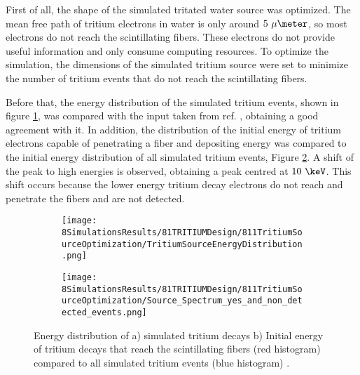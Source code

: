 First of all, the shape of the simulated tritated water source was optimized. The mean free path of tritium electrons in water is only around $5~\mu\meter$, so most electrons do not reach the scintillating fibers. These electrons do not provide useful information and only consume computing resources. To optimize the simulation, the dimensions of the simulated tritium source were set to minimize the number of tritium events that do not reach the scintillating fibers. 

Before that, the energy distribution of the simulated tritium events, shown in figure \ref{subfig:EnergyDistributionTritiumSource}, was compared with the input taken from ref. \cite{TritiumEmissionSpectrum}, obtaining a good agreement with it. In addition, the distribution of the initial energy of tritium electrons capable of penetrating a fiber and depositing energy was compared to the initial energy distribution of all simulated tritium events, Figure \ref{subfig:EnergySpectrumEventsDetectedandNonDetected}. A shift of the peak to high energies is observed, obtaining a peak centred at $10~\keV$. This shift occurs because the lower energy tritium decay electrons do not reach and penetrate the fibers and are not detected.

\begin{figure}
\centering
    \begin{subfigure}[b]{0.45\textwidth}
    \centering
    \texttt{[image: 8SimulationsResults/81TRITIUMDesign/811TritiumSourceOptimization/TritiumSourceEnergyDistribution.png]}  
    \caption{\label{subfig:EnergyDistributionTritiumSource}}
    \end{subfigure}
    \hfill
    \begin{subfigure}[b]{0.45\textwidth}
    \centering
    \texttt{[image: 8SimulationsResults/81TRITIUMDesign/811TritiumSourceOptimization/Source\_Spectrum\_yes\_and\_non\_detected\_events.png]}  
    \caption{\label{subfig:EnergySpectrumEventsDetectedandNonDetected}}
    \end{subfigure}
 \caption{Energy distribution of a) simulated tritium decays b) Initial energy of tritium decays that reach the scintillating fibers (red histogram) compared to all simulated tritium events (blue histogram) \cite{SimulationPaperCarlos}.
 \label{fig:TritiumSourceOptimization}}
\end{figure}

